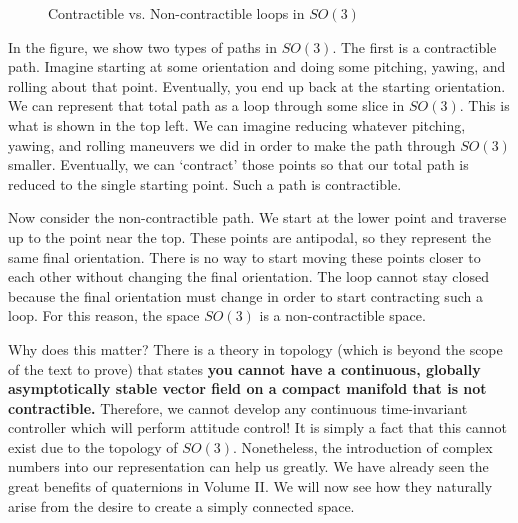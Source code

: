 \begin{figure}[ht]

    \caption{Contractible vs. Non-contractible loops in $SO(3)$}
    \label{fig:so3 contractible}
\end{figure}
In the figure, we show two types of paths in $SO(3)$. The first is a contractible path. Imagine starting at some orientation and doing some pitching, yawing, and rolling about that point. Eventually, you end up back at the starting orientation. We can represent that total path as a loop through some slice in $SO(3)$. This is what is shown in the top left. We can imagine reducing whatever pitching, yawing, and rolling maneuvers we did in order to make the path through $SO(3)$ smaller. Eventually, we can `contract' those points so that our total path is reduced to the single starting point. Such a path is contractible.

Now consider the non-contractible path. We start at the lower point and traverse up to the point near the top. These points are antipodal, so they represent the same final orientation. There is no way to start moving these points closer to each other without changing the final orientation. The loop cannot stay closed because the final orientation must change in order to start contracting such a loop. For this reason, the space $SO(3)$ is a non-contractible space.

Why does this matter? There is a theory in topology (which is beyond the scope of the text to prove) that states \textbf{you cannot have a continuous, globally asymptotically stable vector field on a compact manifold that is not contractible.} Therefore, we cannot develop any continuous time-invariant controller which will perform attitude control! It is simply a fact that this cannot exist due to the topology of $SO(3)$. Nonetheless, the introduction of complex numbers into our representation can help us greatly. We have already seen the great benefits of quaternions in Volume II. We will now see how they naturally arise from the desire to create a simply connected space.

